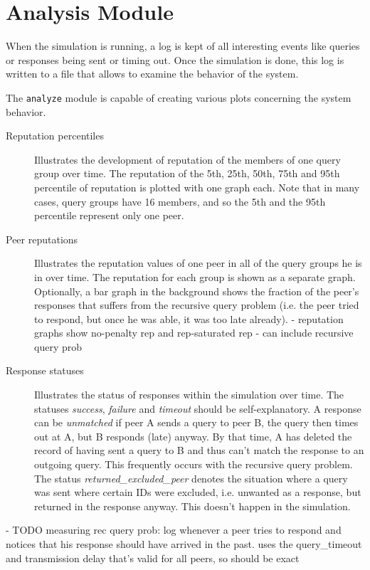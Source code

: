 \section{Analysis Module}
When the simulation is running, a log is kept of all interesting events like
queries or responses being sent or timing out. Once the simulation is done, this
log is written to a file that allows to examine the behavior of the system.

The \texttt{analyze} module is capable of creating various plots concerning the
system behavior.
\begin{description}
\item[Reputation percentiles] Illustrates the development of reputation of the
members of one query group over time. The reputation of the 5th, 25th, 50th,
75th and 95th percentile of reputation is plotted with one graph each. Note that
in many cases, query groups have 16 members, and so the 5th and the 95th
percentile represent only one peer.
\item[Peer reputations] Illustrates the reputation values of one peer in all of
the query groups he is in over time. The reputation for each group is shown as a
separate graph. Optionally, a bar graph in the background shows the fraction of
the peer's responses that suffers from the recursive query problem (i.e. the
peer tried to respond, but once he was able, it was too late already).
- reputation graphs show no-penalty rep and rep-saturated rep
- can include recursive query prob
\item[Response statuses] Illustrates the status of responses within the
simulation over time. The statuses \emph{success}, \emph{failure} and
\emph{timeout} should be self-explanatory. A response can be \emph{unmatched} if
peer A sends a query to peer B, the query then times out at A, but B responds
(late) anyway. By that time, A has deleted the record of having sent a query to
B and thus can't match the response to an outgoing query. This frequently occurs
with the recursive query problem. The status \emph{returned\_excluded\_peer}
denotes the situation where a query was sent where certain IDs were excluded,
i.e.  unwanted as a response, but returned in the response anyway. This doesn't
happen in the simulation.
\end{description}

- TODO measuring rec query prob: log whenever a peer tries to respond and
  notices that his response should have arrived in the past. uses the
  query\_timeout and transmission delay that's valid for all peers, so should be
  exact
